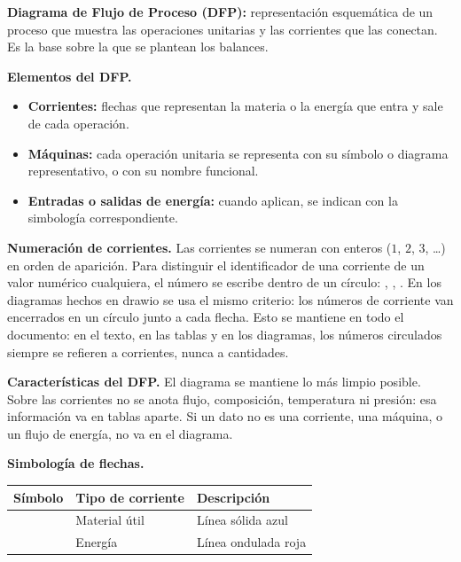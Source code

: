 
\textbf{Diagrama de Flujo de Proceso (DFP):} representación
esquemática de un proceso que muestra las operaciones unitarias y las
corrientes que las conectan. Es la base sobre la que se plantean los
balances.

\textbf{Elementos del DFP.}

\begin{itemize}
    \item \textbf{Corrientes:} flechas que representan la materia o
    la energía que entra y sale de cada operación.
    \item \textbf{Máquinas:} cada operación unitaria se representa con
    su símbolo o diagrama representativo, o con su nombre funcional.
    \item \textbf{Entradas o salidas de energía:} cuando aplican, se
    indican con la simbología correspondiente.
\end{itemize}

\begin{notafija}
\textbf{Numeración de corrientes.} Las corrientes se numeran con
enteros ($1$, $2$, $3$, \ldots) en orden de aparición. Para
distinguir el identificador de una corriente de un valor numérico
cualquiera, el número se escribe dentro de un círculo:
, , . En los diagramas hechos
en drawio se usa el mismo criterio: los números de corriente van
encerrados en un círculo junto a cada flecha. Esto se mantiene en
todo el documento: en el texto, en las tablas y en los diagramas, los
números circulados siempre se refieren a corrientes, nunca a
cantidades.
\end{notafija}

\textbf{Características del DFP.} El diagrama se mantiene lo más
limpio posible. Sobre las corrientes no se anota flujo, composición,
temperatura ni presión: esa información va en tablas aparte. Si un
dato no es una corriente, una máquina, o un flujo de energía, no va
en el diagrama.

\textbf{Simbología de flechas.}

\begin{center}
\renewcommand{\arraystretch}{1.6}
\begin{tabular}{|C{2cm}|L{4cm}|L{6cm}|}
\hline
\textbf{Símbolo} & \textbf{Tipo de corriente} & \textbf{Descripción} \\
\hline
{} & Material útil & Línea sólida azul \\
\hline
{} & Energía & Línea ondulada roja \\
\hline
\end{tabular}
\end{center}

